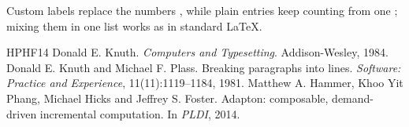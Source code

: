 \documentclass{article}
\begin{document}
Custom labels replace the numbers \cite{knuth84}, while plain entries keep
counting from one \cite{plass81}; mixing them in one list
\cite{knuth84,plass81,hammer14} works as in standard LaTeX.

\begin{thebibliography}{HPHF14}
 Donald E. Knuth. \emph{Computers and Typesetting}. Addison-Wesley, 1984.
 Donald E. Knuth and Michael F. Plass. Breaking paragraphs
  into lines. \emph{Software: Practice and Experience}, 11(11):1119--1184, 1981.
 Matthew A. Hammer, Khoo Yit Phang, Michael Hicks and
  Jeffrey S. Foster. Adapton: composable, demand-driven incremental
  computation. In \emph{PLDI}, 2014.
\end{thebibliography}
\end{document}

